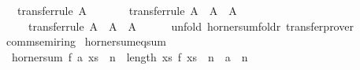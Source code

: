 \begin{isabellebody}
\ \ \ {\isacharbrackleft}{\kern0pt}transfer{\isacharunderscore}{\kern0pt}rule{\isacharbrackright}{\kern0pt}{\isacharcolon}{\kern0pt}\ {\isacartoucheopen}A\ {}\ {}{\isacartoucheclose}\isanewline
\ \ \ \ \ {\isacharbrackleft}{\kern0pt}transfer{\isacharunderscore}{\kern0pt}rule{\isacharbrackright}{\kern0pt}{\isacharcolon}{\kern0pt}\ {\isacartoucheopen}{\isacharparenleft}{\kern0pt}A\ {\isacharequal}{\kern0pt}{\isacharequal}{\kern0pt}{\isacharequal}{\kern0pt}{\isachargreater}{\kern0pt}\ A\ {\isacharequal}{\kern0pt}{\isacharequal}{\kern0pt}{\isacharequal}{\kern0pt}{\isachargreater}{\kern0pt}\ A{\isacharparenright}{\kern0pt}\ {\isacharparenleft}{\kern0pt}{\isacharplus}{\kern0pt}{\isacharparenright}{\kern0pt}\ {\isacharparenleft}{\kern0pt}{\isacharplus}{\kern0pt}{\isacharparenright}{\kern0pt}{\isacartoucheclose}\isanewline
\ \ \ \ \ {\isacharbrackleft}{\kern0pt}transfer{\isacharunderscore}{\kern0pt}rule{\isacharbrackright}{\kern0pt}{\isacharcolon}{\kern0pt}\ {\isacartoucheopen}{\isacharparenleft}{\kern0pt}A\ {\isacharequal}{\kern0pt}{\isacharequal}{\kern0pt}{\isacharequal}{\kern0pt}{\isachargreater}{\kern0pt}\ A\ {\isacharequal}{\kern0pt}{\isacharequal}{\kern0pt}{\isacharequal}{\kern0pt}{\isachargreater}{\kern0pt}\ A{\isacharparenright}{\kern0pt}\ {\isacharparenleft}{\kern0pt}{\isacharasterisk}{\kern0pt}{\isacharparenright}{\kern0pt}\ {\isacharparenleft}{\kern0pt}{\isacharasterisk}{\kern0pt}{\isacharparenright}{\kern0pt}{\isacartoucheclose}\isanewline
%
\isadelimproof
\ \ %
\endisadelimproof
%
\isatagproof
{}\isamarkupfalse%
\ {\isacharparenleft}{\kern0pt}unfold\ horner{\isacharunderscore}{\kern0pt}sum{\isacharunderscore}{\kern0pt}foldr{\isacharparenright}{\kern0pt}\ transfer{\isacharunderscore}{\kern0pt}prover%
\endisatagproof
{\isafoldproof}%
%
\isadelimproof
\isanewline
%
\endisadelimproof
\isanewline
{}\isamarkupfalse%
\isanewline
\isanewline
{}\isamarkupfalse%
\ comm{\isacharunderscore}{\kern0pt}semiring{\isacharunderscore}{\kern0pt}{}\isanewline
{}\isanewline
\isanewline
{}\isamarkupfalse%
\ horner{\isacharunderscore}{\kern0pt}sum{\isacharunderscore}{\kern0pt}eq{\isacharunderscore}{\kern0pt}sum{\isacharcolon}{\kern0pt}\isanewline
\ \ {\isacartoucheopen}horner{\isacharunderscore}{\kern0pt}sum\ f\ a\ xs\ {\isacharequal}{\kern0pt}\ {\isacharparenleft}{\kern0pt}{\isasymSum}n\ {\isacharequal}{\kern0pt}\ {}{\isachardot}{\kern0pt}{\isachardot}{\kern0pt}{\isacharless}{\kern0pt}length\ xs{\isachardot}{\kern0pt}\ f\ {\isacharparenleft}{\kern0pt}xs\ {\isacharbang}{\kern0pt}\ n{\isacharparenright}{\kern0pt}\ {\isacharasterisk}{\kern0pt}\ a\ {\isacharcircum}{\kern0pt}\ n{\isacharparenright}{\kern0pt}{\isacartoucheclose}\isanewline

\end{isabellebody}
